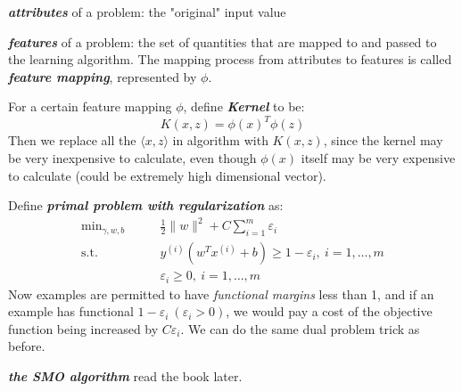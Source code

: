 \documentclass{article}
\begin{document}
\emph{\textbf{attributes}} of a problem: the "original" input value

\emph{\textbf{features}} of a problem: the set of quantities that are mapped to and passed to the learning algorithm. The mapping process from attributes to features is called \emph{\textbf{feature mapping}}, represented by $\phi$.

For a certain feature mapping $\phi$, define \emph{\textbf{Kernel}} to be:
\begin{equation*}
K(x,z)=\phi(x)^T\phi(z)
\end{equation*}
Then we replace all the $\langle x,z\rangle$ in algorithm with $K(x,z)$, since the kernel may be very inexpensive to calculate, even though $\phi(x)$ itself may be very expensive to calculate (could be extremely high dimensional vector).

Define \emph{\textbf{primal problem with regularization}} as:
\begin{align*}
\min\nolimits_{\gamma,w,b}\quad &\quad\frac{1}{2}\lVert w\rVert^2+C\sum_{i=1}^m\varepsilon_i \\
      \text{s.t.}\quad &\quad y^{(i)}(w^Tx^{(i)}+b)\geq1-\varepsilon_i,\ i=1,\ldots,m \\
                       &\quad\varepsilon_i\geq0,\ i=1,\ldots,m
\end{align*}
Now examples are permitted to have \emph{functional margins} less than 1, and if an example has functional $1-\varepsilon_i\ (\varepsilon_i>0)$, we would pay a cost of the objective function being increased by $C\varepsilon_i$.
We can do the same dual problem trick as before.


\emph{\textbf{the SMO algorithm}}
read the book later.
\end{document}
